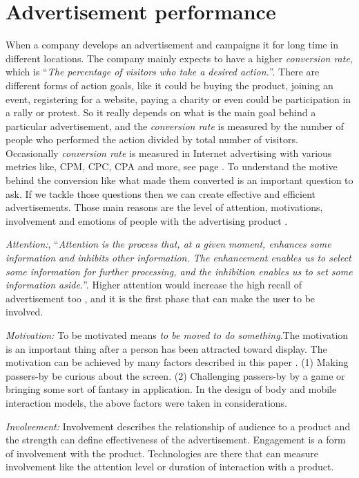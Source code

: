 \section{Advertisement performance}
When a company develops an advertisement and campaigns it for long time in different locations. The company mainly expects to have a higher \emph{conversion rate}, which is ``\emph{The percentage of visitors who take a desired action.}''\cite{convrate}. There are different forms of action goals, like it could be buying the product, joining an event, registering for a website, paying a charity or even could be participation in a rally or protest. So it really depends on what is the main goal behind a particular advertisement, and the \emph{conversion rate} is measured by the number of people who performed the action divided by total number of visitors. Occasionally \emph{conversion rate} is measured in Internet advertising with various metrics like, CPM, CPC, CPA and more, see page \pageref{adperformancebackground}. To understand the motive behind the conversion like what made them converted is an important question to ask. If we tackle those questions then we can create effective and efficient advertisements. Those main reasons are the level of attention, motivations, involvement and emotions of people with the advertising product \cite{pervasiv_ad}.

\emph{Attention:}, ``\emph{Attention is the process that, at a given moment, enhances some information and inhibits other information. The enhancement enables us to select some information for further processing, and the inhibition enables us to set some information aside.}''\cite{Attention}. Higher attention would increase the high recall of advertisement too \cite{add_effectivenss}, and it is the first phase that can make the user to be involved.

\emph{Motivation:}
To be motivated means \emph{to be moved to do something}\cite{motiv}.The motivation is an important thing after a person has been attracted toward display. The motivation can be achieved by many factors described in this paper \cite{toward_motivation}. (1) Making passers-by be curious about the screen. (2) Challenging passers-by by a game or bringing some sort of fantasy in application. In the design of body and mobile interaction models, the above factors were taken in considerations. 

\emph{Involvement:} Involvement describes the relationship of audience to a product and the strength can define effectiveness of the advertisement. Engagement is a form of involvement with the product. Technologies are there that can measure involvement like the attention level or duration of interaction with a product.

